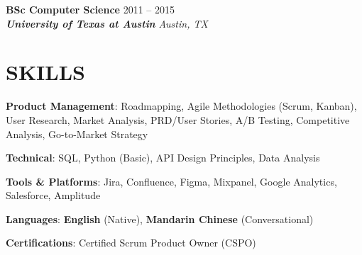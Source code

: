 \documentclass[9pt, letterpaper]{article} %
\newcommand{\entry}[4]{%
    \vspace{0.5ex}
    \textbf{#1} \hfill {\small\color{dates} #4} \\ %
    \textit{#2} \hfill \textit{\small\color{dates} #3} %
}
\begin{document}
\entry{BSc Computer Science}
      {\textbf{University of Texas at Austin}}
      {Austin, TX}
      {2011 -- 2015}


\section{SKILLS}

\textbf{Product Management}: Roadmapping, Agile Methodologies (Scrum, Kanban), User Research, Market Analysis, PRD/User Stories, A/B Testing, Competitive Analysis, Go-to-Market Strategy

\textbf{Technical}: SQL, Python (Basic), API Design Principles, Data Analysis

\textbf{Tools \& Platforms}: Jira, Confluence, Figma, Mixpanel, Google Analytics, Salesforce, Amplitude

\textbf{Languages}: \textbf{English} (Native), \textbf{Mandarin Chinese} (Conversational)

\textbf{Certifications}: Certified Scrum Product Owner (CSPO)


\end{document}
